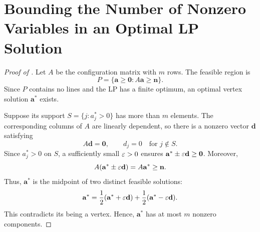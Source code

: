 \section{Bounding the Number of Nonzero Variables in an Optimal LP Solution}
\label{app:lp-nonzero-variables}

\begin{proof}[Proof of ]
    Let $A$ be the configuration matrix with $m$ rows.
    The feasible region is
    \[
        P=\{\mathbf{a}\geq\mathbf{0}:A\mathbf{a}\geq\mathbf{n}\}.
    \]
    Since $P$ contains no lines and the LP has a finite
    optimum, an optimal vertex solution $\mathbf{a}^*$ exists.

    Suppose its support $S=\{j:a_j^*>0\}$ has more than
    $m$ elements. The corresponding columns of $A$ are
    linearly dependent, so there is a nonzero vector
    $\mathbf{d}$ satisfying
    \[
        A\mathbf{d}=\mathbf{0},
        \qquad d_j=0\quad\text{for }j\notin S.
    \]
    Since $a_j^*>0$ on $S$, a sufficiently small
    $\varepsilon>0$ ensures $\mathbf{a}^*\pm\varepsilon\mathbf{d}\geq\mathbf{0}$.
    Moreover,
    \[
        A(\mathbf{a}^*\pm\varepsilon\mathbf{d})
        =A\mathbf{a}^*\geq\mathbf{n}.
    \]
    Thus, $\mathbf{a}^*$ is the midpoint of two distinct
    feasible solutions:
    \[
        \mathbf{a}^*
        =\frac{1}{2}(\mathbf{a}^*+\varepsilon\mathbf{d})
        +\frac{1}{2}(\mathbf{a}^*-\varepsilon\mathbf{d}).
    \]
    This contradicts its being a vertex. Hence,
    $\mathbf{a}^*$ has at most $m$ nonzero components.
\end{proof}
